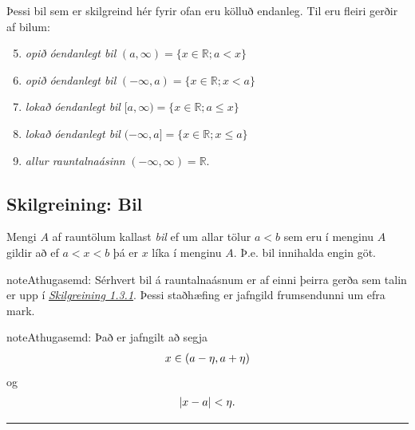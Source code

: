 \documentclass[b5paper,10pt,icelandic]{sphinxmanual}
\begin{document}
Þessi bil sem er skilgreind hér fyrir ofan eru kölluð endanleg. Til eru
fleiri gerðir af bilum:
\begin{enumerate}
\setcounter{enumi}{4}
\item {} 
\emph{opið óendanlegt bil} \((a,\infty)=\{x\in \mathbb{R}; a<x\}\)

\item {} 
\emph{opið óendanlegt bil} \((-\infty, a)=\{x\in \mathbb{R}; x<a\}\)

\item {} 
\emph{lokað óendanlegt bil} \([a,\infty)=\{x\in \mathbb{R}; a\leq x\}\)

\item {} 
\emph{lokað óendanlegt bil} \((-\infty, a]=\{x\in \mathbb{R}; x\leq a\}\)

\item {} 
\emph{allur rauntalnaásinn} \((-\infty, \infty)= \mathbb{R}\).

\end{enumerate}


\subsection{Skilgreining: Bil}
\label{kafli01:id1}
Mengi \(A\) af rauntölum kallast \textit{bil} ef um allar
tölur \(a<b\) sem eru í menginu \(A\) gildir að ef \(a<x<b\)
þá er \(x\) líka í menginu \(A\). Þ.e. bil innihalda engin göt.

\begin{notice}{note}{Athugasemd:}
Sérhvert bil á rauntalnaásnum er af einni þeirra gerða sem talin er
upp í {\hyperref[kafli01:skilgreining\string-1\string-3\string-1]{\emph{Skilgreining 1.3.1}}}. Þessi staðhæfing er jafngild frumsendunni um
efra mark.
\end{notice}

\begin{notice}{note}{Athugasemd:}
Það er jafngilt að segja
\begin{gather}
\begin{split}x \in (a-\eta,a+\eta)\end{split}\notag
\end{gather}
og
\begin{gather}
\begin{split}|x-a| < \eta.\end{split}\notag
\end{gather}\end{notice}


\bigskip\hrule{}\bigskip
\end{document}
